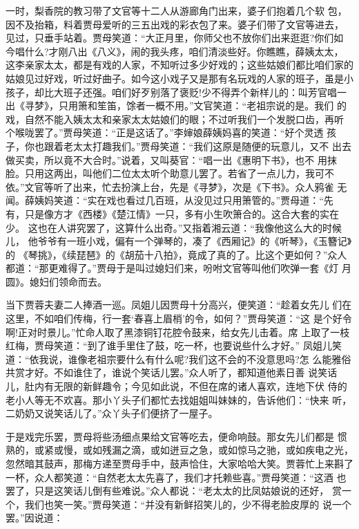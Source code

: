 一时，梨香院的教习带了文官等十二人从游廊角门出来，婆子们抱着几个软
包，因不及抬箱，料着贾母爱听的三五出戏的彩衣包了来。婆子们带了文官等进去，
见过，只垂手站着。贾母笑道：“大正月里，你师父也不放你们出来逛逛?你们如
今唱什么?才刚八出《八义》，闹的我头疼，咱们清淡些好。你瞧瞧，薛姨太太，
这李亲家太太，都是有戏的人家，不知听过多少好戏的；这些姑娘们都比咱们家的
姑娘见过好戏，听过好曲子。如今这小戏子又是那有名玩戏的人家的班子，虽是小
孩子，却比大班子还强。咱们好歹别落了褒贬!少不得弄个新样儿的：叫芳官唱一
出《寻梦》，只用箫和笙笛，馀者一概不用。”文官笑道：“老祖宗说的是。我们
的戏，自然不能入姨太太和亲家太太姑娘们的眼；不过听我们一个发脱口齿，再听
个喉咙罢了。”贾母笑道：“正是这话了。”李婶娘薛姨妈喜的笑道：“好个灵透
孩子，你也跟着老太太打趣我们。”贾母笑道：“我们这原是随便的玩意儿，又不
出去做买卖，所以竟不大合时。”说着，又叫葵官：“唱一出《惠明下书》，也不
用抹脸。只用这两出，叫他们二位太太听个助意儿罢了。若省了一点儿力，我可不
依。”文官等听了出来，忙去扮演上台，先是《寻梦》，次是《下书》。众人鸦雀
无闻。薛姨妈笑道：“实在戏也看过几百班，从没见过只用箫管的。”贾母道：“先
有，只是像方才《西楼》《楚江情》一只，多有小生吹箫合的。这合大套的实在少。
这也在人讲究罢了，这算什么出奇。”又指着湘云道：“我像他这么大的时候儿，
他爷爷有一班小戏，偏有一个弹琴的，凑了《西厢记》的《听琴》，《玉簪记》的
《琴挑》，《续琵琶》的《胡茄十八拍》，竟成了真的了。比这个更如何？”众人
都道：“那更难得了。”贾母于是叫过媳妇们来，吩咐文官等叫他们吹弹一套《灯
月圆》。媳妇们领命而去。

当下贾蓉夫妻二人捧酒一巡。凤姐儿因贾母十分高兴，便笑道：“趁着女先儿
们在这里，不如咱们传梅，行一套‘春喜上眉梢’的令，如何？”贾母笑道：“这
是个好令啊!正对时景儿。”忙命人取了黑漆铜钉花腔令鼓来，给女先儿击着。席
上取了一枝红梅，贾母笑道：“到了谁手里住了鼓，吃一杯，也要说些什么才好。”
凤姐儿笑道：“依我说，谁像老祖宗要什么有什么呢?我们这不会的不没意思吗?怎
么能雅俗共赏才好。不如谁住了，谁说个笑话儿罢。”众人听了，都知道他素日善
说笑话儿，肚内有无限的新鲜趣令；今见如此说，不但在席的诸人喜欢，连地下伏
侍的老小人等无不欢喜。那小丫头子们都忙去找姐姐叫妹妹的，告诉他们：“快来
听，二奶奶又说笑话儿了。”众丫头子们便挤了一屋子。

于是戏完乐罢，贾母将些汤细点果给文官等吃去，便命响鼓。那女先儿们都是
惯熟的，或紧或慢，或如残漏之滴，或如迸豆之急，或如惊马之驰，或如疾电之光，
忽然暗其鼓声，那梅方递至贾母手中，鼓声恰住，大家哈哈大笑。贾蓉忙上来斟了
一杯，众人都笑道：“自然老太太先喜了，我们才托赖些喜。”贾母笑道：“这酒
也罢了，只是这笑话儿倒有些难说。”众人都说：“老太太的比凤姑娘说的还好，
赏一个，我们也笑一笑。”贾母笑道：“并没有新鲜招笑儿的，少不得老脸皮厚的
说一个罢。”因说道：

